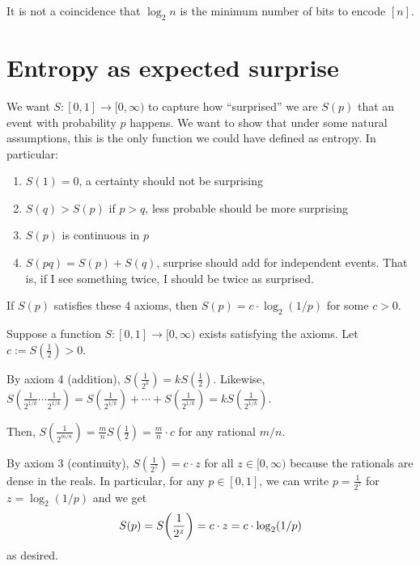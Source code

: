 \documentclass[class=co432,notes,tikz]{agony}
\begin{document}
It is not a coincidence that $\log_2 n$ is the minimum number of bits to encode $[n]$.

\section{Entropy as expected surprise}

We want $S : [0,1] \to [0,\infty)$ to capture how ``surprised''
we are $S(p)$ that an event with probability $p$ happens.
We want to show that under some natural assumptions,
this is the only function we could have defined as entropy.
In particular:

\begin{enumerate}
  \item $S(1) = 0$, a certainty should not be surprising
  \item $S(q) > S(p)$ if $p > q$, less probable should be more surprising
  \item $S(p)$ is continuous in $p$
  \item $S(pq) =  S(p) + S(q)$, surprise should add for independent events.
        That is, if I see something twice, I should be twice as surprised.
\end{enumerate}


\begin{prop}
  If $S(p)$ satisfies these 4 axioms, then $S(p)=c\cdot \log_2(1/p)$ for some $c > 0$.
\end{prop}
\begin{prf}
  Suppose a function $S : [0,1] \to [0,\infty)$ exists satisfying the axioms.
  Let $c := S(\frac12) > 0$.

  By axiom 4 (addition), $S(\frac{1}{2^k}) = kS(\frac12)$.
  Likewise, $S(\frac{1}{2^{1/k}}\cdots\frac{1}{2^{1/k}})
    = S(\frac{1}{2^{1/k}}) + \dotsb + S(\frac{1}{2^{1/k}}) = kS(\frac{1}{2^{1/k}})$.

  Then, $S(\frac{1}{2^{m/n}}) = \frac{m}{n}S(\frac12) = \frac{m}{n}\cdot c$
  for any rational $m/n$.

  By axiom 3 (continuity), $S(\frac{1}{2^z}) = c \cdot z$ for all $z \in [0,\infty)$
  because the rationals are dense in the reals.
  In particular, for any $p \in [0,1]$,
  we can write $p = \frac{1}{2^z}$ for $z = \log_2(1/p)$
  and we get \[ S\qty(p) = S\qty(\frac{1}{2^z}) = c \cdot z = c \cdot \log_2(1/p) \]
  as desired.
\end{prf}
\end{document}
